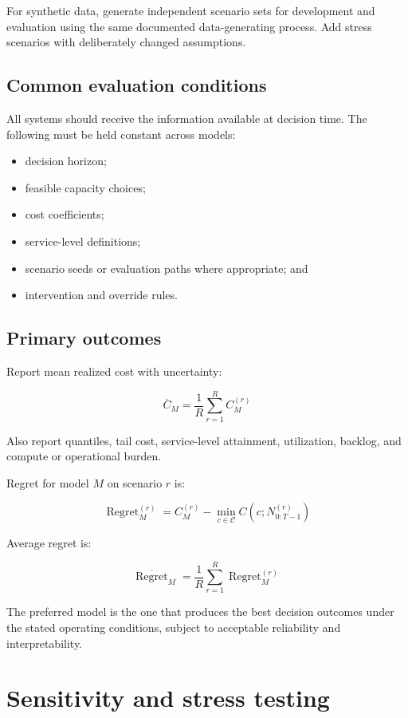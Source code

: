 \documentclass[11pt,a4paper]{article}
\newcommand{\equationnote}[1]{\begin{center}\colorbox{boxblue}{\parbox{0.92\linewidth}{\begin{equation*}#1\end{equation*}}}\end{center}}
\begin{document}
For synthetic data, generate independent scenario sets for development and evaluation using the same documented data-generating process. Add stress scenarios with deliberately changed assumptions.

\subsection{Common evaluation conditions}

All systems should receive the information available at decision time. The following must be held constant across models:
\begin{itemize}
  \item decision horizon;
  \item feasible capacity choices;
  \item cost coefficients;
  \item service-level definitions;
  \item scenario seeds or evaluation paths where appropriate; and
  \item intervention and override rules.
\end{itemize}

\subsection{Primary outcomes}

Report mean realized cost with uncertainty:

\equationnote{\overline{C}_M = \frac{1}{R}\sum_{r=1}^{R} C_M^{(r)}}

Also report quantiles, tail cost, service-level attainment, utilization, backlog, and compute or operational burden.

Regret for model $M$ on scenario $r$ is:

\equationnote{\operatorname{Regret}_M^{(r)} = C_M^{(r)} - \min_{c \in \mathcal{C}} C\left(c;N_{0:T-1}^{(r)}\right)}

Average regret is:

\equationnote{\overline{\operatorname{Regret}}_M = \frac{1}{R}\sum_{r=1}^{R}\operatorname{Regret}_M^{(r)}}

The preferred model is the one that produces the best decision outcomes under the stated operating conditions, subject to acceptable reliability and interpretability.

\section{Sensitivity and stress testing}
\end{document}
